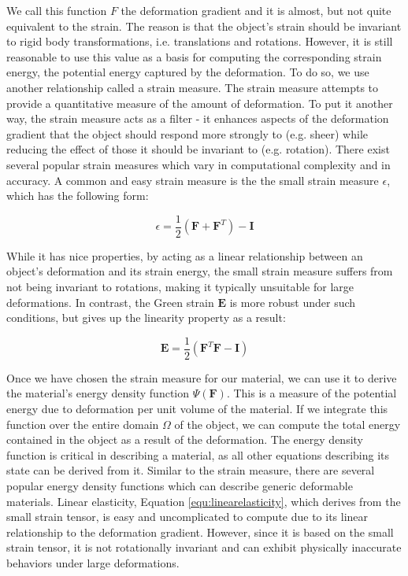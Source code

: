 We call this function $F$ the deformation gradient and it is almost,
but not quite equivalent to the strain. The reason is that the object's
strain should be invariant to rigid body transformations,
i.e. translations and rotations. However, it is still reasonable to
use this value as a basis for computing the corresponding strain
energy, the potential energy captured by the deformation. To do so, we
use another relationship called a strain measure. The strain measure
attempts to provide a quantitative measure of the amount of
deformation. To put it another way, the strain measure acts as a
filter - it enhances aspects of the deformation gradient that the
object should respond more strongly to (e.g. sheer) while reducing the
effect of those it should be invariant to (e.g. rotation). There exist
several popular strain measures which vary in computational complexity
and in accuracy. A common and easy strain measure is the the small
strain measure $\epsilon$, which has the following form:

\begin{equation}
  \label{equ:smallstrain}
  \epsilon = \frac 1 2 (\mathbf{F} + \mathbf{F}^T) - \mathbf{I}
\end{equation}

While it has nice properties, by acting as a linear
relationship between an object's deformation and its strain energy, the small
strain measure suffers from not being invariant to rotations,
making it typically unsuitable for large deformations. In contrast,
the Green strain $\mathbf{E}$ is more robust under such conditions,
but gives up the linearity property as a result:

\begin{equation}
  \label{equ:greenstrain}
  \mathbf{E} = \frac 1 2 (\mathbf{F}^T\mathbf{F}-\mathbf{I})
\end{equation}
  
Once we have chosen the strain measure for our material, we can use
it to derive the material's energy density function
$\Psi(\mathbf{F})$. This is a measure of the potential energy due to
deformation per unit volume of the material. If we integrate this
function over the entire domain $\Omega$ of the object, we can compute
the total energy contained in the object as a result of the
deformation. The energy density function is critical in describing a
material, as all other equations describing its state can be derived
from it. Similar to the strain measure, there are several popular
energy density functions which can describe generic deformable
materials. Linear elasticity, Equation \ref{equ:linearelasticity},
which derives from the small strain tensor, is easy and uncomplicated
to compute due to its linear relationship to the deformation
gradient. However, since it is based on the small strain tensor, it is
not rotationally invariant and can exhibit physically inaccurate
behaviors under large deformations.

